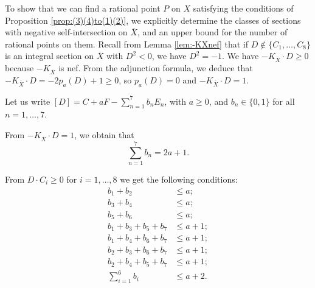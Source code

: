 \documentclass[a4paper, 11pt, reqno]{amsart}
\numberwithin{equation}{section} \numberwithin{figure}{section}
\theoremstyle{definition}
\numberwithin{lemma}{section}
\begin{document}
To show that we can find a rational point $P$ on $X$ satisfying the conditions of Proposition \ref{prop:(3)(4)to(1)(2)}, we explicitly determine the classes of sections with negative self-intersection on $\overline{X}$, and an upper bound for the number of rational points on them. Recall from Lemma  \ref{lem:-KXnef} that if $D \notin \{C_1, \ldots, C_8\}$ is an integral section on $\overline{X}$ with $D^2 < 0$, we have $D^2 = -1$. We have $- K_{\overline{X}} \cdot D \geq 0$ because $-K_{\overline{X}}$ is nef. From the adjunction formula, we deduce that $-K_{\overline{X}} \cdot D = - 2 p_a(D) + 1 \geq 0$, so $p_a(D) = 0$ and $-K_{\overline{X}} \cdot D = 1$.

Let us write $[D] = C + a F - \sum_{n=1}^7 b_n E_n$, with $a \geq 0$, and $b_n \in \{0, 1\}$ for all $n = 1, \ldots, 7$. 

From $-K_{\overline{X}} \cdot D = 1$, we obtain that 
\begin{equation}
    \sum_{n=1}^7 b_n = 2a + 1.\label{eq:(2a)equationa}
\end{equation}

From $D \cdot C_i \geq 0$ for $i = 1, \ldots, 8$ we get the following conditions:
\begin{align*}
    b_1 + b_2 &\leq a;\nonumber\\
    b_3 + b_4 &\leq a;\nonumber\\
    b_5 + b_6 &\leq a;\nonumber\\
    b_1 + b_3 + b_5 + b_7 &\leq a+1;\nonumber\\
    b_1 + b_4 + b_6 + b_7 &\leq a+1;\nonumber\\
    b_2 + b_3 + b_6 + b_7 &\leq a+1;\nonumber\\
    b_2 + b_4 + b_5 + b_7 &\leq a+1;\nonumber\\
    \sum_{i=1}^6 b_i &\leq a + 2.
\end{align*}
\end{document}
